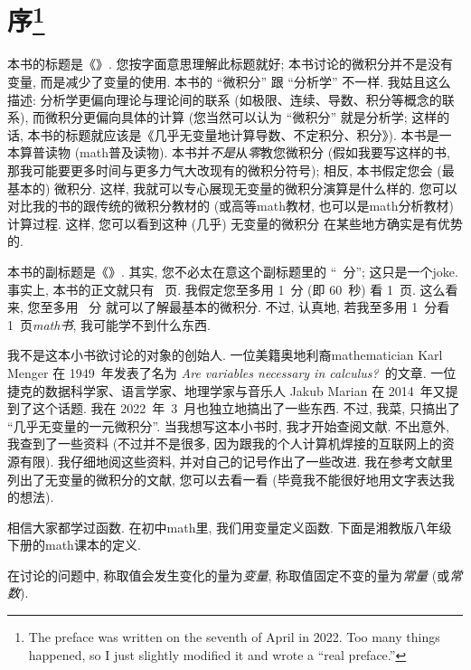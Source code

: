 \chapter[序]{序\footnote{The preface was written
      on the seventh of April in 2022.
      Too many things happened,
      so I just slightly modified it
      and wrote a ``real preface.''}}

本书的标题是《\thetitle{}》.
您按字面意思理解此标题就好;
本书讨论的微积分并不是没有变量, 而是减少了变量的使用.
本书的 ``微积分'' 跟 ``分析学'' 不一样.
我姑且这么描述:
分析学更偏向理论与理论间的联系
(如极限、连续、导数、积分等概念的联系),
而微积分更偏向具体的计算
(您当然可以认为 ``微积分'' 就是分析学;
这样的话,
本书的标题就应该是《几乎无变量地计算导数、不定积分、积分》).
本书是一本算普读物 (\gls{math}普及读物).
本书并\emph{不是}从\emph{零}教您微积分
(假如我要写这样的书,
那我可能要更多时间与更多力气大改现有的微积分符号);
相反, 本书假定您会 (最基本的) 微积分.
这样, 我就可以专心展现无变量的微积分演算是什么样的.
您可以对比我的书的跟传统的微积分教材的
(或高等\gls{math}教材, 也可以是\gls{math}分析教材)
计算过程.
这样, 您可以看到这种 (几乎) 无变量的微积分%
在某些地方确实是有优势的.

本书的副标题是《\thesubtitle{}》.
其实, 您不必太在意这个副标题里的
``\pageref{calculus:LastPage}~分'';
这只是一个\gls{joke}.
事实上, 本书的正文就只有 \pageref{calculus:LastPage}~页.
我假定您至多用 1~分 (即 60~秒) 看 1~页.
这么看来, 您至多用 \pageref{calculus:LastPage}~分%
就可以了解最基本的微积分.
不过, 认真地, 若我至多用 1~分看 1~页\emph{\gls{math}书},
我可能学不到什么东西.

我不是这本小书欲讨论的对象的创始人.
一位美籍奥地利裔\gls{mathematician} Karl Menger
在 1949~年发表了名为
\textit{Are variables necessary in calculus?}\ 的文章.
一位捷克的数据科学家、语言学家、地理学家与音乐人
Jakub Marian 在 2014~年又提到了这个话题.
我在 2022~年~3~月也独立地搞出了一些东西.
不过, 我菜, 只搞出了 ``几乎无变量的一元微积分''.
当我想写这本小书时, 我才开始查阅文献.
不出意外, 我查到了一些资料
(不过并不是很多, 因为跟我的个人计算机焊接的互联网上的资源有限).
我仔细地阅这些资料, 并对自己的记号作出了一些改进.
我在参考文献里列出了无变量的微积分的文献, 您可以去看一看
(毕竟我不能很好地用文字表达我的想法).

相信大家都学过函数.
在初中\gls{math}里, 我们用变量定义函数.
下面是湘教版八年级下册的\gls{math}课本的定义.

\begin{definition*}
    在讨论的问题中,
    称取值会发生变化的量为\emph{变量},
    称取值固定不变的量为\emph{常量} (或\emph{常数}).
\end{definition*}

